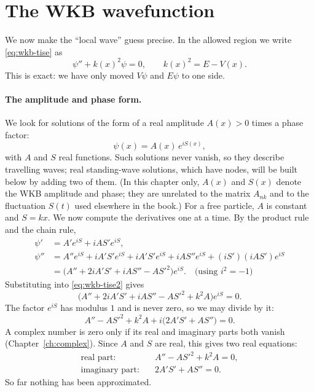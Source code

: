 \section{The WKB wavefunction}\label{sec:wkb-ansatz}

We now make the ``local wave'' guess precise. In the allowed region we write \cref{eq:wkb-tise} as
\begin{equation}
\psi''+k(x)^2\psi=0,\qquad k(x)^2=E-V(x).
\label{eq:wkb-tise2}
\end{equation}
This is exact: we have only moved $V\psi$ and $E\psi$ to one side.

\paragraph{The amplitude and phase form.} We look for solutions of the form of a real amplitude $A(x)>0$ times a phase factor:
\begin{equation}
\psi(x)=A(x)\,e^{iS(x)},
\label{eq:wkb-ansatz}
\end{equation}
with $A$ and $S$ real functions. Such solutions never vanish, so they describe travelling waves; real standing-wave solutions, which have nodes, will be built below by adding two of them. (In this chapter only, $A(x)$ and $S(x)$ denote the WKB amplitude and phase; they are unrelated to the matrix $A_{nk}$ and to the fluctuation $S(t)$ used elsewhere in the book.) For a free particle, $A$ is constant and $S=kx$. We now compute the derivatives one at a time. By the product rule and the chain rule,
\begin{align}
\psi' &= A'e^{iS}+iAS'e^{iS},\\
\psi'' &= A''e^{iS}+iA'S'e^{iS}+iA'S'e^{iS}+iAS''e^{iS}+(iS')(iAS')e^{iS}\\
&=\bigl(A''+2iA'S'+iAS''-AS'^2\bigr)e^{iS}.\quad\text{(using }i^2=-1\text{)}
\end{align}
Substituting into \cref{eq:wkb-tise2} gives
\begin{equation}
\bigl(A''+2iA'S'+iAS''-AS'^2+k^2A\bigr)e^{iS}=0.
\end{equation}
The factor $e^{iS}$ has modulus $1$ and is never zero, so we may divide by it:
\begin{equation}
A''-AS'^2+k^2A+i\bigl(2A'S'+AS''\bigr)=0.
\end{equation}
A complex number is zero only if its real and imaginary parts both vanish (Chapter~\ref{ch:complex}). Since $A$ and $S$ are real, this gives two real equations:
\begin{align}
\text{real part:}&\quad A''-AS'^2+k^2A=0, \label{eq:wkb-real}\\
\text{imaginary part:}&\quad 2A'S'+AS''=0. \label{eq:wkb-imag}
\end{align}
So far nothing has been approximated.

